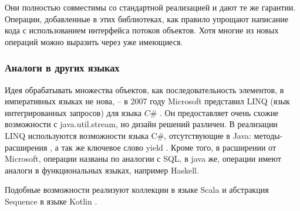 Они полностью совместимы со стандартной реализацией и дают те же гарантии. Операции, добавленные в этих библиотеках, как правило упрощают написание кода с использованием интерфейса потоков объектов. Хотя многие из новых операций можно выразить через уже имеющиеся.

\subsubsection{Аналоги в других языках}
Идея обрабатывать множества объектов, как последовательность элементов, в императивных языках не нова, -- в 2007 году Microsoft представил LINQ (язык интегрированных запросов) для языка $C\#$ \cite{ms:linq}. Он предоставляет очень схожие возможности с java.util.stream, но дизайн решений различен. В реализации LINQ используются возможности языка C\#, отсутствующие в Java: методы-расширения \cite{ms:ext}, а так же ключевое слово yield \cite{ms:yield}. Кроме того, в расширении от Microsoft, операции названы по аналогии с SQL, в java же, операции имеют аналоги в функциональных языках, например Haskell.

Подобные возможности реализуют коллекции в языке Scala \cite{ho:scala} и абстракция Sequence в языке Kotlin \cite{ho:kotlin}.